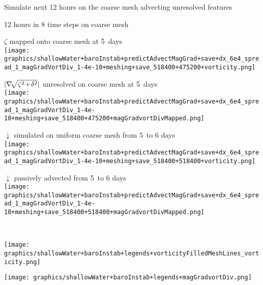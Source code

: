 \begin{slide}
{
    \normalfont\color{purple}
    Simulate next 12 hours on the coarse mesh advecting unresolved features
}

12 hours in 8 time steps on coarse mesh

\begin{minipage}{0.49\linewidth}\centering \small
$\zeta$ mapped onto coarse mesh at 5\half\ days\\
\texttt{[image: graphics/shallowWater+baroInstab+predictAdvectMagGrad+save+dx\_6e4\_spread\_1\_magGradVortDiv\_1-4e-10+meshing+save\_518400+475200+vorticity.png]}
\end{minipage}
%
\begin{minipage}{0.49\linewidth}\centering \small
$|\nabla\negthinspace\sqrt{\zeta^2\negthinspace + \negthinspace \delta^2}|$ unresolved on coarse mesh at 5\half\ days\\
\texttt{[image: graphics/shallowWater+baroInstab+predictAdvectMagGrad+save+dx\_6e4\_spread\_1\_magGradVortDiv\_1-4e-10+meshing+save\_518400+475200+magGradvortDivMapped.png]}
\end{minipage}
%
\begin{minipage}{0.49\linewidth}\centering \small
$\downarrow$ simulated on uniform coarse mesh from 5\half\ to 6 days\\
\texttt{[image: graphics/shallowWater+baroInstab+predictAdvectMagGrad+save+dx\_6e4\_spread\_1\_magGradVortDiv\_1-4e-10+meshing+save\_518400+518400+vorticity.png]}
\end{minipage}
%
\begin{minipage}{0.49\linewidth}\centering \small
$\downarrow$ passively advected from 5\half\ to 6 days\\
\texttt{[image: graphics/shallowWater+baroInstab+predictAdvectMagGrad+save+dx\_6e4\_spread\_1\_magGradVortDiv\_1-4e-10+meshing+save\_518400+518400+magGradvortDivMapped.png]}
\end{minipage}
\\
\begin{minipage}{0.49\linewidth}
\texttt{[image: graphics/shallowWater+baroInstab+legends+vorticityFilledMeshLines\_vorticity.png]}
\end{minipage}
\begin{minipage}{0.49\linewidth}
\texttt{[image: graphics/shallowWater+baroInstab+legends+magGradvortDiv.png]}
\end{minipage}

\end{slide}

